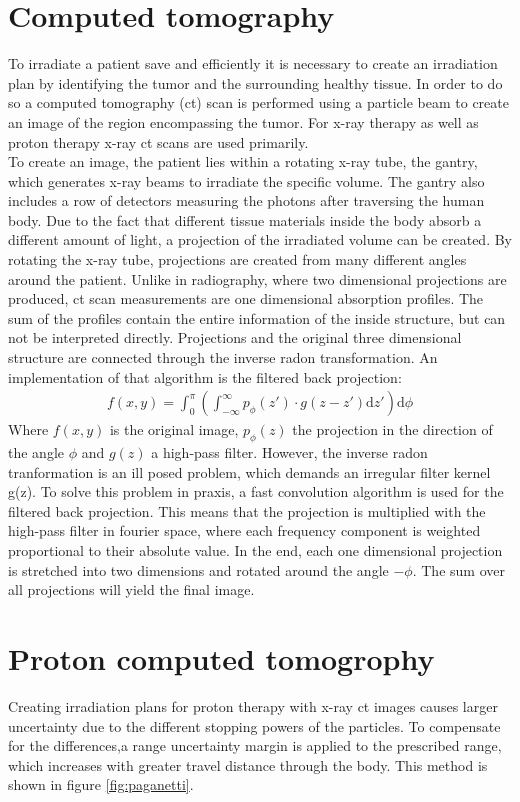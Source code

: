 \section{Computed tomography} \label{sec:ct}
To irradiate a patient save and efficiently it is necessary to create an irradiation plan by identifying the tumor and the surrounding healthy tissue. In order to do so a computed
tomography (ct) scan is performed using a particle beam to create an image of the region encompassing the tumor. For x-ray therapy as well as proton therapy x-ray ct scans
are used primarily. \\
To create an image, the patient lies within a rotating x-ray tube, the gantry, which generates x-ray beams to irradiate the specific volume. The gantry also
includes a row of detectors measuring the photons after traversing the human body. Due to the fact that different tissue materials inside the body absorb a different
amount of light, a projection of the irradiated volume can be created. By rotating the x-ray tube, projections are created from many different angles around the patient.
Unlike in radiography, where two dimensional projections are produced, ct scan measurements are one dimensional absorption profiles. The sum of the profiles contain
the entire information of the inside structure, but can not be interpreted directly. Projections and the original three dimensional structure are connected through
the inverse radon transformation. An implementation of that algorithm is the filtered back projection:
\begin{align}
  f(x,y) = \int_0^{\pi} \left(\int_{-\infty}^{\infty} p_{\phi}(z') \cdot g(z - z') \mathrm{d}z'\right) \mathrm{d}\phi
\end{align}
Where $f(x,y)$ is the original image, $p_{\phi}(z)$ the projection in the direction of the angle $\phi$ and $g(z)$ a high-pass filter. However, the inverse
radon tranformation is an ill posed problem, which demands an irregular filter kernel g(z). To solve this problem in praxis, a fast convolution algorithm is used for the
filtered back projection. This means that the projection is multiplied with the high-pass filter in fourier space, where each frequency component is weighted proportional to their
absolute value. In the end, each one dimensional projection is stretched into two dimensions and rotated around the angle $-\phi$. The sum over all projections will yield the
final image.


\section{Proton computed tomogrophy}
Creating irradiation plans for proton therapy with x-ray ct images causes larger uncertainty due to the different stopping powers of the particles.
To compensate for the differences,a range uncertainty margin is applied to the prescribed range, which increases with greater travel distance through the body. This
method is shown in figure \ref{fig:paganetti}.

